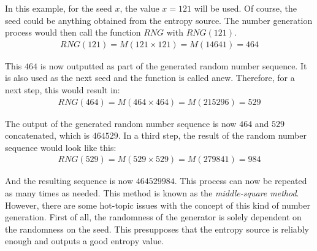 \noindent
In this example, for the seed $x$, the value $x = 121$ will be used. Of course, the seed could be anything obtained from the entropy source.
The number generation process would then call the function $RNG$ with $RNG(121)$.
$$
\begin{array}{l}
    RNG(121) = M \left(121 \times 121\right) = M(14641) = 464
\end{array}
$$

\noindent
This $464$ is now outputted as part of the generated random number sequence. It is also used as the next seed and the function is called anew.
Therefore, for a next step, this would result in:
$$
\begin{array}{l}
    RNG(464) = M \left(464 \times 464\right) = M(215296) = 529
\end{array}
$$

\noindent
The output of the generated random number sequence is now $464$ and $529$ concatenated, which is $464529$.
In a third step, the result of the random number sequence would look like this:
$$
\begin{array}{l}
    RNG(529) = M \left(529 \times 529\right) = M(279841) = 984
\end{array}
$$

\noindent
And the resulting sequence is now $464529984$. This process can now be repeated as many times as needed. This method is known as the \emph{middle-square method}.
However, there are some hot-topic issues with the concept of this kind of number generation. First of all, the randomness of the generator is solely dependent on the randomness on the seed.
This presupposes that the entropy source is reliably enough and outputs a good entropy value.

